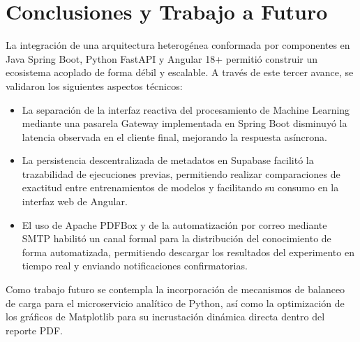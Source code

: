\section{Conclusiones y Trabajo a Futuro}\label{sec:conclusiones}

La integración de una arquitectura heterogénea conformada por componentes en Java Spring Boot, Python FastAPI y Angular 18+ permitió construir un ecosistema acoplado de forma débil y escalable. A través de este tercer avance, se validaron los siguientes aspectos técnicos:

\begin{itemize}
    \item La separación de la interfaz reactiva del procesamiento de Machine Learning mediante una pasarela Gateway implementada en Spring Boot disminuyó la latencia observada en el cliente final, mejorando la respuesta asíncrona.
    \item La persistencia descentralizada de metadatos en Supabase facilitó la trazabilidad de ejecuciones previas, permitiendo realizar comparaciones de exactitud entre entrenamientos de modelos y facilitando su consumo en la interfaz web de Angular.
    \item El uso de Apache PDFBox y de la automatización por correo mediante SMTP habilitó un canal formal para la distribución del conocimiento de forma automatizada, permitiendo descargar los resultados del experimento en tiempo real y enviando notificaciones confirmatorias.
\end{itemize}

Como trabajo futuro se contempla la incorporación de mecanismos de balanceo de carga para el microservicio analítico de Python, así como la optimización de los gráficos de Matplotlib para su incrustación dinámica directa dentro del reporte PDF.
